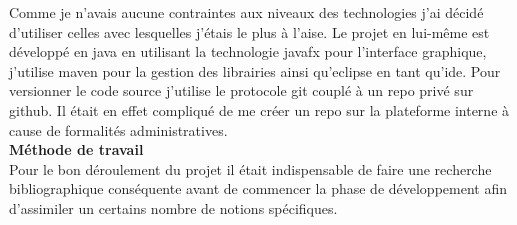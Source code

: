 Comme je n'avais aucune contraintes aux niveaux des technologies j'ai décidé d'utiliser celles avec lesquelles j'étais le plus à l'aise. Le projet en lui-même est développé en \gls{java} en utilisant la technologie \gls{javafx} pour l'interface graphique, j'utilise \gls{maven} pour la gestion des librairies ainsi qu'\gls{eclipse} en tant qu'\gls{ide}. Pour versionner le code source j'utilise le protocole \gls{git} couplé à un \gls{repo} privé sur \gls{github}. Il était en effet compliqué de me créer un \gls{repo} sur la plateforme interne à cause de formalités administratives.\\

\textbf{Méthode de travail}\\
Pour le bon déroulement du projet il était indispensable de faire une recherche bibliographique conséquente avant de commencer la phase de développement afin d'assimiler un certains nombre de notions spécifiques.